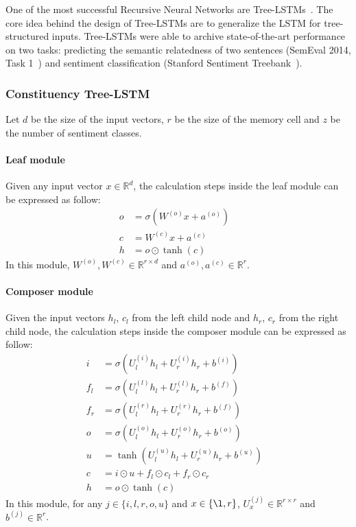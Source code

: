 One of the most successful Recursive Neural Networks are Tree-LSTMs~\cite{treeLSTM}.
The core idea behind the design of Tree-LSTMs are to generalize the LSTM for tree-structured inputs.
Tree-LSTMs were able to archive state-of-the-art performance on two tasks: predicting the semantic relatedness of two sentences (SemEval 2014, Task 1~\cite{SemeEvalTask1}) and sentiment classification (Stanford Sentiment Treebank~\cite{socher2013recursive}).
\subsubsection{Constituency Tree-LSTM}\label{treelstm}
Let \(d\) be the size of the input vectors, \(r
\) be the size of the memory cell and \(z\) be the number of sentiment classes. 
\paragraph{Leaf module}
Given any input vector \(x \in \mathbb{R}^d\), the calculation steps inside the leaf module can be expressed as follow:
\begin{align}
o &= \sigma{\left( W^{(o)} x + a^{\left(o\right)}\right)} & \\
c &= W^{(c)} x + a^{(c)} & \\
h &= o \odot \tanh{\left(c\right)} &
\end{align}
In this module, \(W^{(o)}, W^{(c)} \in \mathbb{R}^{r \times d}\) and \(a^{\left(o\right)}, a^{(c)} \in \mathbb{R}^r\).
\paragraph{Composer module}
Given the input vectors \({h_l}\), \({c_l}\) from the left child node and \({h_r}\), \({c_r}\) from the right child node, the calculation steps inside the composer module can be expressed as follow:
\begin{align}
i &= \sigma{ \left(U_l^{(i)} h_{l} + U_r^{(i)} h_{r} + b^{(i)} \right) } &\\
f_{l} &= \sigma{\left(U_{l}^{(l)} h_{l} + U_{r}^{(l)} h_{r} + b^{(f)}\right)} & \\
f_{r} &= \sigma{\left(U_{l}^{(r)} h_{l} + U_{r}^{(r)} h_{r} + b^{(f)}\right)} & \\
o &= \sigma{\left( U_l^{(o)} h_{l} + U_r^{(o)} h_{r} + b^{(o)}\right)} &\\
u &= \tanh{\left( U_l^{(u)} h_{l} + U_r^{(u)} h_{r} + b^{(u)}\right)} &\\
c &= i \odot u + f_{l} \odot c_{l} + f_{r} \odot c_{r} & \\
h &= o \odot \tanh{\left(c\right)} &
\end{align}
In this module, for any \(j \in \{i, l, r, o, u\}\) and \(x \in \{\l, r\}\), \(U_x^{(j)} \in \mathbb{R}^{r \times r}\) and \( b^{(j)} \in \mathbb{R}^r\).
